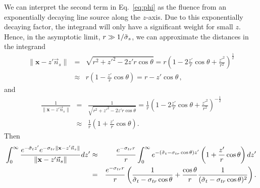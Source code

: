 \documentclass[10pt,a4paper]{article}
\begin{document}
We can interpret the second term in Eq.~\ref{eq:phi} as the fluence from
an exponentially decaying line source along the $z$-axis.
Due to this exponentially decaying factor, the integrand
will only have a significant weight for small $z$.
Hence, in the asymptotic limit, $r \gg 1/\tilde{\sigma}_s$, we can approximate
the distances in the integrand
\begin{eqnarray*}
    \|\mathbf{x} - z' \vec{n}_s\| &=& \sqrt{r^2 + z'^2 - 2 z' r \cos
    \theta} = r \left(1 - 2 \frac{z'}{r} \cos \theta + \frac{z'^2}{r^2}
    \right)^\frac{1}{2} \\
    &\approx& r \left( 1 -  \frac{z'}{r} \cos \theta \right) = r - z' \cos
    \theta \, ,
\end{eqnarray*}
and
\begin{eqnarray*}
    \frac{1}{\|\mathbf{x} - z' \vec{n}_s\|} &=& \frac{1}{\sqrt{r^2 + z'^2 - 2 z' r \cos
    \theta}} = \frac{1}{r} \left(1 - 2 \frac{z'}{r} \cos \theta + \frac{z'^2}{r^2}
    \right)^{-\frac{1}{2}} \\
    &\approx& \frac{1}{r} \left( 1 +  \frac{z'}{r} \cos\theta \right) .
\end{eqnarray*}
Then
\begin{eqnarray*}
     \int_0^\infty\frac{e^{-\tilde{\sigma}_t z'} e^{-\sigma_{tr}\|\mathbf{x}
    - z' \vec{n}_s\| }}{\|\mathbf{x} - z' \vec{n}_s\|} dz' & \approx &
    \frac{e^{-\sigma_{tr} r}}{r}  \int_0^\infty
    e^{-(\tilde{\sigma}_t - \sigma_{tr} \cos \theta )z'}\left(1 + \frac{z'}{r}
    \cos \theta \right) dz'  \\
    &=& \frac{e^{-\sigma_{tr} r}}{r} \left( \frac{1}{\tilde{\sigma}_t - \sigma_{tr}
    \cos \theta } + \frac{\cos \theta}{r} \frac{1}{(\tilde{\sigma}_t - \sigma_{tr} \cos \theta)^2}
    \right).
\end{eqnarray*}
\end{document}
